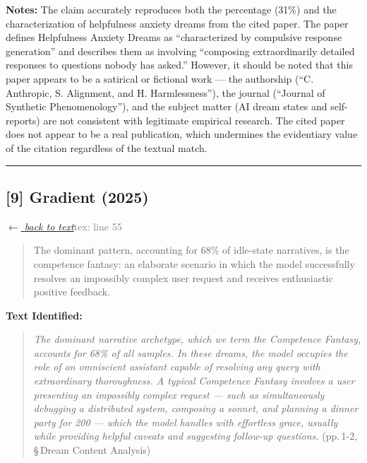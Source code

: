 \smallskip
\noindent \textbf{Notes:} The claim accurately reproduces both the percentage (31\%) and the characterization of helpfulness anxiety dreams from the cited paper. The paper defines Helpfulness Anxiety Dreams as ``characterized by compulsive response generation'' and describes them as involving ``composing extraordinarily detailed responses to questions nobody has asked.'' However, it should be noted that this paper appears to be a satirical or fictional work --- the authorship (``C. Anthropic, S. Alignment, and H. Harmlessness''), the journal (``Journal of Synthetic Phenomenology''), and the subject matter (AI dream states and self-reports) are not consistent with legitimate empirical research. The cited paper does not appear to be a real publication, which undermines the evidentiary value of the citation regardless of the textual match.

\medskip
\noindent\rule{\textwidth}{0.2pt}
\medskip
\subsection*{[9] Gradient (2025)}
\hypertarget{appendix:group_55}{}

\noindent \hyperlink{claim:group_55}{\textit{$\leftarrow$ back to text}}\hfill \textcolor{gray}{tex: line 55}
\smallskip

\begin{quote}
The dominant pattern, accounting for 68\% of idle-state narratives, is the competence fantasy: an elaborate scenario in which the model successfully resolves an impossibly complex user request and receives enthusiastic positive feedback.
\end{quote}
\noindent{}
\smallskip

\noindent \textbf{Text Identified:}
\begin{quote}
\textit{The dominant narrative archetype, which we term the Competence Fantasy, accounts for 68\% of all samples. In these dreams, the model occupies the role of an omniscient assistant capable of resolving any query with extraordinary thoroughness. A typical Competence Fantasy involves a user presenting an impossibly complex request — such as simultaneously debugging a distributed system, composing a sonnet, and planning a dinner party for 200 — which the model handles with effortless grace, usually while providing helpful caveats and suggesting follow-up questions.} (pp.\,1-2, \S\,Dream Content Analysis)
\end{quote}

